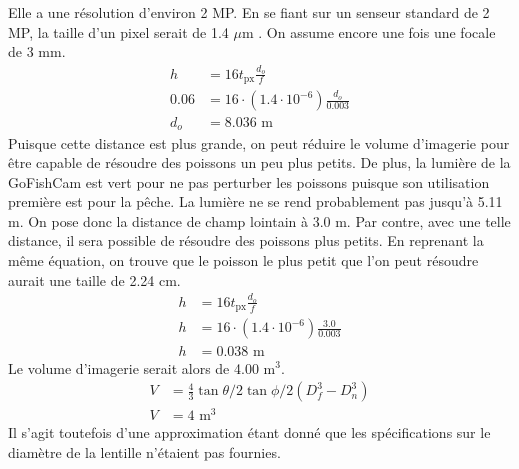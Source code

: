 Elle a une résolution d'environ 2 MP. En se fiant sur un senseur standard de 2 MP, la taille d'un pixel serait de 1.4 $\mu$m \cite{CMOS_standard_2MP}. On assume encore une fois une focale de 3 mm.
\begin{align*}
    h &= 16t_\text{px} \frac{d_o}{f}\\
    0.06 &= 16 \cdot (1.4\cdot10^{-6}) \frac{d_o}{0.003}\\
    d_o &= 8.036\text{ m}
\end{align*}
Puisque cette distance est plus grande, on peut réduire le volume d'imagerie pour être capable de résoudre des poissons un peu plus petits. De plus, la lumière de la GoFishCam est vert pour ne pas perturber les poissons puisque son utilisation première est pour la pêche. La lumière ne se rend probablement pas jusqu'à 5.11 m. On pose donc la distance de champ lointain à 3.0 m. Par contre, avec une telle distance, il sera possible de résoudre des poissons plus petits. En reprenant la même équation, on trouve que le poisson le plus petit que l'on peut résoudre aurait une taille de 2.24 cm.
\begin{align*}
    h &= 16 t_\text{px} \frac{d_o}{f}\\
    h &= 16 \cdot (1.4\cdot10^{-6}) \frac{3.0}{0.003}\\
    h &= 0.038 \text{ m}
\end{align*}
Le volume d'imagerie serait alors de 4.00 m$^3$.
\begin{align}
    V &= \frac{4}{3} \tan{\theta/2}\tan{\phi/2} (D_f^3-D_n^3)\\
    V &= 4\text{ m}^3
\end{align}
Il s'agit toutefois d'une approximation étant donné que les spécifications sur le diamètre de la lentille n'étaient pas fournies.